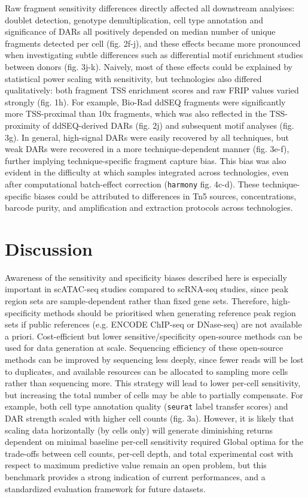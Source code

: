 Raw fragment sensitivity differences directly affected all downstream analyises: doublet detection, genotype demultiplication, cell type annotation and significance of DARs all positively depended on median number of unique fragments detected per cell (fig. 2f-j), and these effects became more pronounced when investigating subtle differences such as differential motif enrichment studies between donors (fig. 3j-k). Naively, most of these effects could be explained by statistical power scaling with sensitivity, but technologies also differed qualitatively:  both fragment TSS enrichment scores and raw FRIP values varied strongly (fig. 1h). For example, Bio-Rad ddSEQ fragments were significantly more TSS-proximal than 10x fragments, which was also reflected in the TSS-proximity of ddSEQ-derived DARs (fig. 2j) and subsequent motif analyses (fig. 3g). In general, high-signal DARs were easily recovered by all techniques, but weak DARs were recovered in a more technique-dependent manner (fig. 3e-f), further implying technique-specific fragment capture bias. This bias was also evident in the difficulty at which samples integrated across technologies, even after computational batch-effect correction (\verb|harmony| fig. 4c-d). These technique-specific biases could be attributed to differences in Tn5 sources, concentrations, barcode purity, and amplification and extraction protocols across technologies.

\section{Discussion}
Awareness of the sensitivity and specificity biases described here is especially important in scATAC-seq studies compared to scRNA-seq studies, since peak region sets are sample-dependent rather than fixed gene sets. Therefore, high-specificity methods should be prioritised when generating reference peak region sets if public references (e.g. ENCODE ChIP-seq or DNase-seq) are not available a priori. Cost-efficient but lower sensitive/specificity open-source methods can be used for data generation at scale. Sequencing efficiency of these open-source methods can be improved by sequencing less deeply, since fewer reads will be lost to duplicates, and available resources can be allocated to sampling more cells rather than sequencing more. This strategy will lead to lower per-cell sensitivity, but increasing the total number of cells may be able to partially compensate. For example, both cell type annotation quality (\verb|seurat| label transfer scores) and DAR strength scaled with higher cell counts (fig. 3a). However, it is likely that scaling data horizontally (by cells only) will generate diminishing returns dependent on minimal baseline per-cell sensitivity required Global optima for the trade-offs between cell counts, per-cell depth, and total experimental cost with respect to maximum predictive value remain an open problem, but this benchmark provides a strong indication of current performances, and a standardized evaluation framework for future datasets.